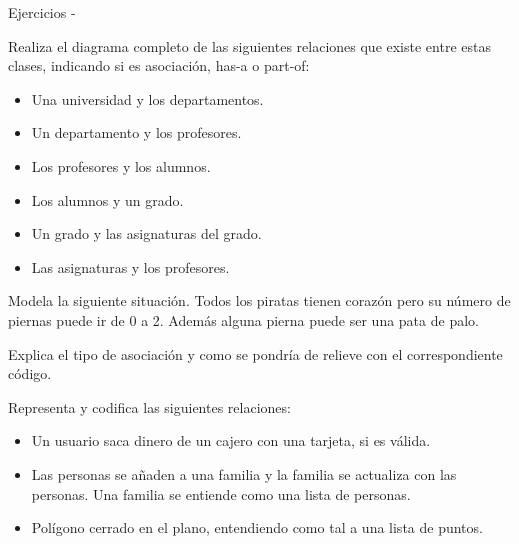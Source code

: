 \documentclass[10pt,envcountsect,spanish]{beamer}
\begin{document}
\begin{frame}[allowframebreaks]{Ejercicios - }



\begin{ejercicio}{}
Realiza el diagrama completo de las siguientes relaciones que existe entre estas clases, indicando si es asociación, has-a o part-of:

\hfil \begin{minipage}{.6\textwidth}
\begin{itemize}
\item Una universidad y los departamentos.
\item Un departamento y los profesores.
\item Los profesores y los alumnos.
\item Los alumnos y un grado.
\item Un grado y las asignaturas del grado.
\item Las asignaturas y los profesores.
\end{itemize}
\end{minipage}

\end{ejercicio}


\begin{ejercicio}{}
Modela la siguiente situación. Todos los piratas tienen corazón pero su número de piernas puede ir de 0 a 2. Además alguna pierna puede ser una pata de palo.

Explica el tipo de asociación y como se pondría de relieve con el correspondiente código.
\end{ejercicio}


\begin{ejercicio}{}
Representa y codifica las siguientes relaciones:

\hfil \begin{minipage}{.6\textwidth}
\begin{itemize}
\item Un usuario saca dinero de un cajero con una tarjeta, si es válida.
\item Las personas se añaden a una familia y la familia se actualiza con las personas. Una familia se entiende como una lista de personas.
\item Polígono cerrado en el plano, entendiendo como tal a una lista de puntos.
\end{itemize}
\end{minipage}
\end{ejercicio}





\end{frame}
\end{document}
